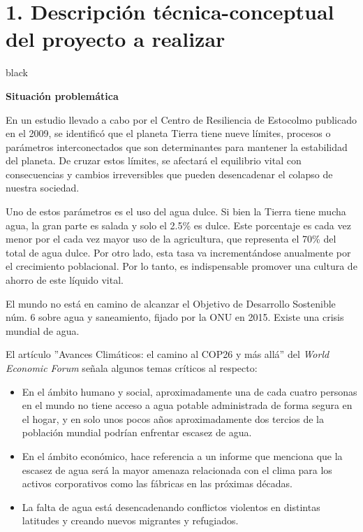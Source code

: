 \documentclass[
11pt, %
codirector, %
]{charter}
\begin{document}
\section{1. Descripción técnica-conceptual del proyecto a realizar}
\label{sec:descripcion}


\begin{consigna}{black} %

\textbf{Situación problemática} 

En un estudio llevado a cabo por el Centro de Resiliencia de Estocolmo publicado en el 2009, se identificó que el planeta Tierra tiene nueve límites, procesos o parámetros interconectados que son determinantes para mantener la estabilidad del planeta. De cruzar estos límites, se afectará el equilibrio vital con consecuencias y cambios irreversibles que pueden desencadenar el colapso de nuestra sociedad.

Uno de estos parámetros es el uso del agua dulce. Si bien la Tierra tiene mucha agua, la gran parte es salada y solo el 2.5\% es dulce. Este porcentaje es cada vez menor por el cada vez mayor uso de la agricultura, que representa el 70\% del total de agua dulce. Por otro lado, esta tasa va incrementándose anualmente por el crecimiento poblacional. Por lo tanto, es indispensable promover una cultura de ahorro de este líquido vital.

El mundo no está en camino de alcanzar el Objetivo de Desarrollo Sostenible núm. 6 sobre agua y saneamiento, fijado por la ONU en 2015. Existe una crisis mundial de agua.


El artículo ''Avances Climáticos: el camino al COP26 y más allá'' del \textit{World Economic Forum} señala algunos temas críticos al respecto:
\begin{itemize}
	\item En el ámbito humano y social, aproximadamente una de cada cuatro personas en el mundo no tiene acceso a agua potable administrada de forma segura en el hogar, y en solo unos pocos años aproximadamente dos tercios de la población mundial podrían enfrentar escasez de agua.
	\item En el ámbito económico, hace referencia a un informe que menciona que la escasez de agua será la mayor amenaza relacionada con el clima para los activos corporativos como las fábricas en las próximas décadas.
	\item La falta de agua está desencadenando conflictos violentos en distintas latitudes y creando nuevos migrantes y refugiados.
\end{itemize}


\end{consigna}
\end{document}
